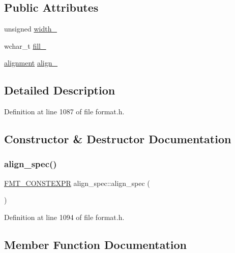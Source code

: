 \subsection*{Public Attributes}
\begin{DoxyCompactItemize}
\item 
unsigned \hyperlink{structalign__spec_a27454583473a3ceab8c12b0060748ae8}{width\+\_\+}
\item 
wchar\+\_\+t \hyperlink{structalign__spec_a0fa9232e9b9f8c428bbebca3e7278da9}{fill\+\_\+}
\item 
\hyperlink{format_8h_a5460ac1c70db05be4ec2268f463ea981}{alignment} \hyperlink{structalign__spec_aecf6413f2b63d90a4350375a247d26ad}{align\+\_\+}
\end{DoxyCompactItemize}


\subsection{Detailed Description}


Definition at line 1087 of file format.\+h.



\subsection{Constructor \& Destructor Documentation}
\mbox{\label{structalign__spec_ac4bda09e8d5c54631bf9dc29be445c4a}} 
\subsubsection{\texorpdfstring{align\+\_\+spec()}{align\_spec()}}
{\footnotesize\ttfamily \hyperlink{core_8h_a69201cb276383873487bf68b4ef8b4cd}{F\+M\+T\+\_\+\+C\+O\+N\+S\+T\+E\+X\+PR} align\+\_\+spec\+::align\+\_\+spec (\begin{DoxyParamCaption}{ }\end{DoxyParamCaption})\hspace{0.3cm}{\ttfamily [inline]}}



Definition at line 1094 of file format.\+h.



\subsection{Member Function Documentation}
\mbox{\label{structalign__spec_a538c770bce8dfea8510e1ff82e62e2ac}} 
